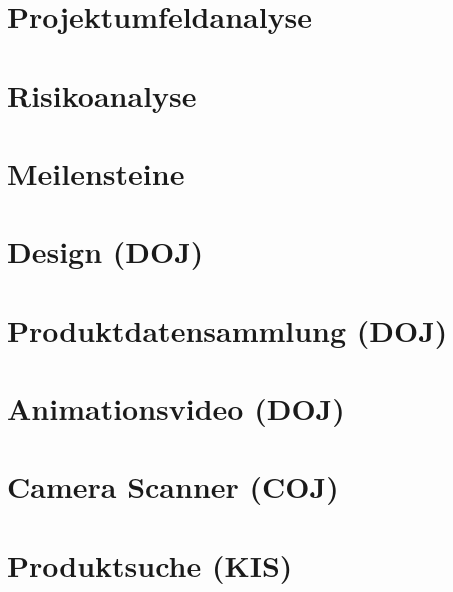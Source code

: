 \documentclass[
    headings=optiontotocandhead,%
    twoside,
    numbers=noenddot,%
    toc=flat, %
    12pt, %
    titlepage, %
    parskip=full, %
    listof=totoc, %
    listof=flat, %
    numbers=noenddot, %
    bibliography=totoc, %
    a4paper,DIV=14,
    BCOR=15mm,
]{scrbook}
\begin{document}
\chapter{Projektumfeldanalyse}
\renewcommand{\kapitelautor}{Autor: Rafael Doja}


\chapter{Risikoanalyse}
\renewcommand{\kapitelautor}{Autor: Rafael Doja}


\chapter{Meilensteine}
\renewcommand{\kapitelautor}{Autor: Rafael Doja}



\chapter{Design (DOJ)}
\renewcommand{\kapitelautor}{Autor: Rafael Doja}


\chapter{Produktdatensammlung (DOJ)}
\renewcommand{\kapitelautor}{Autor: Rafael Doja}

\chapter{Animationsvideo (DOJ)}
\renewcommand{\kapitelautor}{Autor: Rafael Doja}

\chapter{Camera Scanner (COJ)}
\renewcommand{\kapitelautor}{Autor: Filip Coja}


\chapter{Produktsuche (KIS)}
\renewcommand{\kapitelautor}{Autor: Daniel Kisling}

\end{document}
